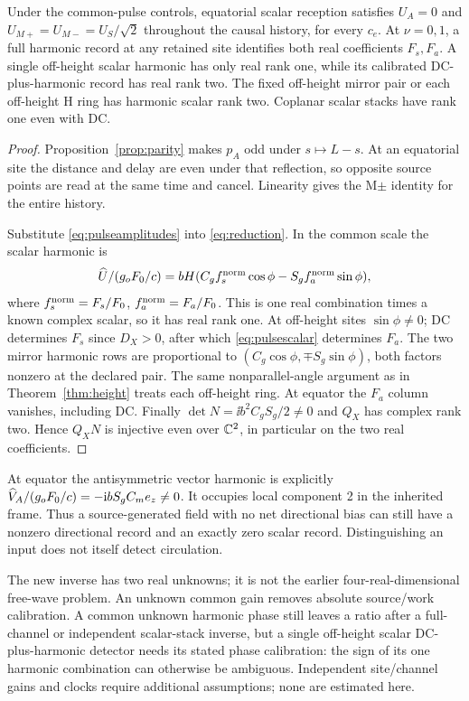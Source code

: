\begin{theorem}\label{thm:pulseinverse}
Under the common-pulse controls, equatorial scalar reception satisfies $U_A=0$ and $U_{M+}=U_{M-}=U_S/\sqrt2$ throughout the causal history, for every $c_e$. At $\nu=0,1$, a full harmonic record at any retained site identifies both real coefficients $F_s,F_a$. A single off-height scalar harmonic has only real rank one, while its calibrated DC-plus-harmonic record has real rank two. The fixed off-height mirror pair or each off-height H ring has harmonic scalar rank two. Coplanar scalar stacks have rank one even with DC.
\end{theorem}
\begin{proof}
Proposition~\ref{prop:parity} makes $p_A$ odd under $s\mapsto L-s$. At an equatorial site the distance and delay are even under that reflection, so opposite source points are read at the same time and cancel. Linearity gives the M$\pm$ identity for the entire history.

Substitute \eqref{eq:pulseamplitudes} into \eqref{eq:reduction}. In the common scale the scalar harmonic is
\begin{equation}\label{eq:pulsescalar}
 \widehat U/(g_oF_0/c)=bH(C_g f_s^{\rm norm}\cos\phi-S_g f_a^{\rm norm}\sin\phi),
\end{equation}
where $f_s^{\rm norm}=F_s/F_0$, $f_a^{\rm norm}=F_a/F_0$. This is one real combination times a known complex scalar, so it has real rank one. At off-height sites $\sin\phi\ne0$; DC determines $F_s$ since $D_X>0$, after which \eqref{eq:pulsescalar} determines $F_a$. The two mirror harmonic rows are proportional to $(C_g\cos\phi,\mp S_g\sin\phi)$, both factors nonzero at the declared pair. The same nonparallel-angle argument as in Theorem~\ref{thm:height} treats each off-height ring. At equator the $F_a$ column vanishes, including DC. Finally $\det N=\ii b^2C_gS_g/2\ne0$ and $Q_X$ has complex rank two. Hence $Q_XN$ is injective even over $\mathbb C^2$, in particular on the two real coefficients.
\end{proof}

At equator the antisymmetric vector harmonic is explicitly
$\widehat V_A/(g_oF_0/c)=-\mathrm i bS_gC_me_z\ne0$. It occupies local component 2 in the inherited frame. Thus a source-generated field with no net directional bias can still have a nonzero directional record and an exactly zero scalar record. Distinguishing an input does not itself detect circulation.

The new inverse has two real unknowns; it is not the earlier four-real-dimensional free-wave problem. An unknown common gain removes absolute source/work calibration. A common unknown harmonic phase still leaves a ratio after a full-channel or independent scalar-stack inverse, but a single off-height scalar DC-plus-harmonic detector needs its stated phase calibration: the sign of its one harmonic combination can otherwise be ambiguous. Independent site/channel gains and clocks require additional assumptions; none are estimated here.

